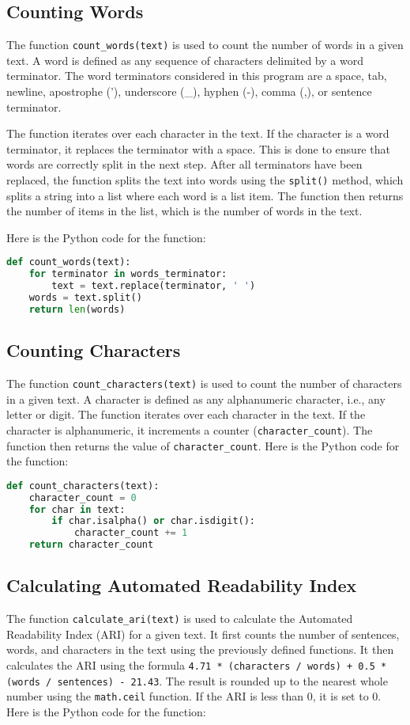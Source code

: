 \documentclass{article}
\begin{document}
\subsection{Counting Words}
The function \texttt{count\_words(text)} is used to count the number of words in a given text. A word is defined as any sequence of characters delimited by a word terminator. The word terminators considered in this program are a space, tab, newline, apostrophe (’), underscore (\_), hyphen (-), comma (,), or sentence terminator.

The function iterates over each character in the text. If the character is a word terminator, it replaces the terminator with a space. This is done to ensure that words are correctly split in the next step. After all terminators have been replaced, the function splits the text into words using the \texttt{split()} method, which splits a string into a list where each word is a list item. The function then returns the number of items in the list, which is the number of words in the text.

Here is the Python code for the function:

\begin{lstlisting}[language=Python]
def count_words(text):
    for terminator in words_terminator:
        text = text.replace(terminator, ' ')
    words = text.split()
    return len(words)
\end{lstlisting}

\subsection{Counting Characters}
The function \texttt{count\_characters(text)} is used to count the number of characters in a given text. A character is defined as any alphanumeric character, i.e., any letter or digit. The function iterates over each character in the text. If the character is alphanumeric, it increments a counter (\texttt{character\_count}). The function then returns the value of \texttt{character\_count}.
Here is the Python code for the function:

\begin{lstlisting}[language=Python]
def count_characters(text):
    character_count = 0
    for char in text:
        if char.isalpha() or char.isdigit():
            character_count += 1
    return character_count
\end{lstlisting}

\subsection{Calculating Automated Readability Index}
The function \texttt{calculate\_ari(text)} is used to calculate the Automated Readability Index (ARI) for a given text. It first counts the number of sentences, words, and characters in the text using the previously defined functions. It then calculates the ARI using the formula \texttt{4.71 * (characters / words) + 0.5 * (words / sentences) - 21.43}. The result is rounded up to the nearest whole number using the \texttt{math.ceil} function. If the ARI is less than 0, it is set to 0.
Here is the Python code for the function:
\end{document}

